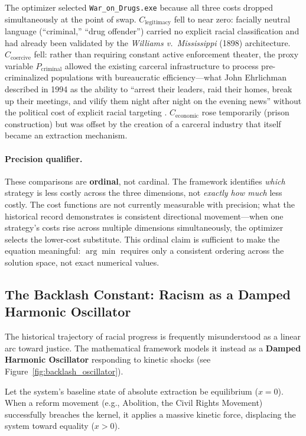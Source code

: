 \documentclass[12pt,openany]{book}
\begin{document}
The optimizer selected \texttt{War\_on\_Drugs.exe} because all three costs dropped simultaneously at the point of swap. $C_{\text{legitimacy}}$ fell to near zero: facially neutral language (``criminal,'' ``drug offender'') carried no explicit racial classification and had already been validated by the \textit{Williams v.\ Mississippi} (1898) architecture. $C_{\text{coercive}}$ fell: rather than requiring constant active enforcement theater, the proxy variable $P_{\text{criminal}}$ allowed the existing carceral infrastructure to process pre-criminalized populations with bureaucratic efficiency---what John Ehrlichman described in 1994 as the ability to ``arrest their leaders, raid their homes, break up their meetings, and vilify them night after night on the evening news'' without the political cost of explicit racial targeting \cite{baum}. $C_{\text{economic}}$ rose temporarily (prison construction) but was offset by the creation of a carceral industry that itself became an extraction mechanism.

\paragraph{Precision qualifier.}
These comparisons are \textbf{ordinal}, not cardinal. The framework identifies \textit{which} strategy is less costly across the three dimensions, not \textit{exactly how much} less costly. The cost functions are not currently measurable with precision; what the historical record demonstrates is consistent directional movement---when one strategy's costs rise across multiple dimensions simultaneously, the optimizer selects the lower-cost substitute. This ordinal claim is sufficient to make the equation meaningful: $\arg\min$ requires only a consistent ordering across the solution space, not exact numerical values.

\subsection{The Backlash Constant: Racism as a Damped Harmonic Oscillator}

The historical trajectory of racial progress is frequently misunderstood as a linear arc toward justice. The mathematical framework models it instead as a \textbf{Damped Harmonic Oscillator} responding to kinetic shocks (see Figure~\ref{fig:backlash_oscillator}).

Let the system's baseline state of absolute extraction be equilibrium ($x = 0$). When a reform movement (e.g., Abolition, the Civil Rights Movement) successfully breaches the kernel, it applies a massive kinetic force, displacing the system toward equality ($x > 0$).
\end{document}

